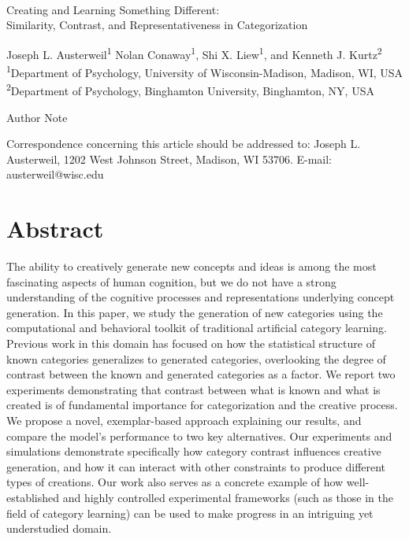 \documentclass[12pt]{article}
\newcommand\jlanote[1]{\todo[inline, backgroundcolor = lime]{\textbf{JLA}: #1}}
\begin{document}
\begin{center}
\hfill
\\[1in]

Creating and Learning Something Different: \\
Similarity, Contrast, and Representativeness in Categorization


\vfill
Joseph L. Austerweil\textsuperscript{1}
Nolan Conaway\textsuperscript{1}, 
Shi X. Liew\textsuperscript{1},
and Kenneth J. Kurtz\textsuperscript{2}
\\[\baselineskip]
\textsuperscript{1}Department of Psychology, University of Wisconsin-Madison, Madison, WI, USA
\textsuperscript{2}Department of Psychology, Binghamton University, Binghamton, NY, USA
\\[1in]

\vfill

Author Note

Correspondence concerning this article should be addressed to: 
Joseph L. Austerweil, 1202 West Johnson Street, Madison, WI 53706.
E-mail: austerweil@wisc.edu

\end{center}
\clearpage


\doublespacing
\section*{Abstract}
\jlanote{need to update}
The ability to creatively generate new concepts and ideas is among the most fascinating aspects of human cognition, but we do not have a strong understanding of the cognitive processes and representations underlying concept generation. In this paper, we study the generation of new categories using the computational and behavioral toolkit of traditional artificial category learning. Previous work in this domain has focused on how the statistical structure of known categories generalizes to generated categories, overlooking the degree of contrast between the known and generated categories as a factor. We report two experiments demonstrating that contrast between what is known and what is created is of fundamental importance for categorization and the creative process. We propose a novel, exemplar-based approach explaining our results, and compare the model's performance to two key alternatives. Our experiments and simulations demonstrate specifically how category contrast influences creative generation, and how it can interact with other constraints to produce different types of creations. Our work also serves as a concrete example of how well-established and highly controlled experimental frameworks (such as those in the field of category learning) can be used to make progress in an intriguing yet understudied domain.
\end{document}
